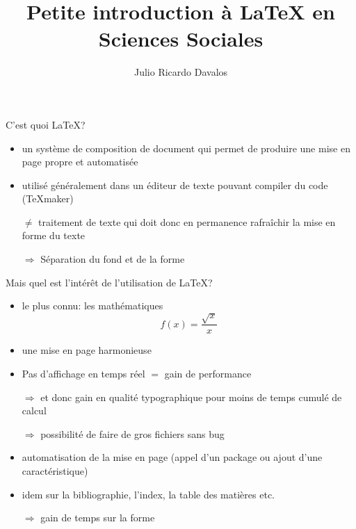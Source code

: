 \documentclass[8pt]{beamer}\usepackage[]{graphicx}\usepackage[]{xcolor}
\title{Petite introduction à \LaTeX{} en Sciences Sociales}
\author{Julio Ricardo Davalos}
\institute{CEMS (EHESS-Inserm)}
\begin{document}
	\begin{frame}
    \titlepage
	\end{frame}
	
		\begin{frame}
	  \begin{block}{C'est quoi \LaTeX?}
	    \begin{itemize}
	      \item un système de composition de document qui permet de produire une mise en page propre et automatisée
	      \item utilisé généralement dans un éditeur de texte pouvant compiler du code (\TeX maker)
	      \item[$\neq$] traitement de texte qui doit donc en permanence rafraîchir la mise en forme du texte
	      \item[$\Rightarrow$] Séparation du fond et de la forme
	    \end{itemize}
	  \end{block}
	  \begin{alertblock}{Mais quel est l'intérêt de l'utilisation de \LaTeX?}
	    \begin{itemize}
	    \item le plus connu: les mathématiques
	      \begin{equation}
  f(x)=\frac{\sqrt{x}}{x} %
  \end{equation}
	    \item une mise en page harmonieuse
	    \item Pas d'affichage en temps réel $=$ gain de performance
	    \item[$\Rightarrow$] et donc gain en qualité typographique pour moins de temps cumulé de calcul
	    \item[$\Rightarrow$] possibilité de faire de gros fichiers sans bug
	    \item automatisation de la mise en page (appel d'un package ou ajout d'une caractéristique)
	    \item idem sur la bibliographie, l'index, la table des matières etc.
	    \item[$\Rightarrow$] gain de temps sur la forme 
	    \end{itemize}
	  \end{alertblock}
	\end{frame}
\end{document}
